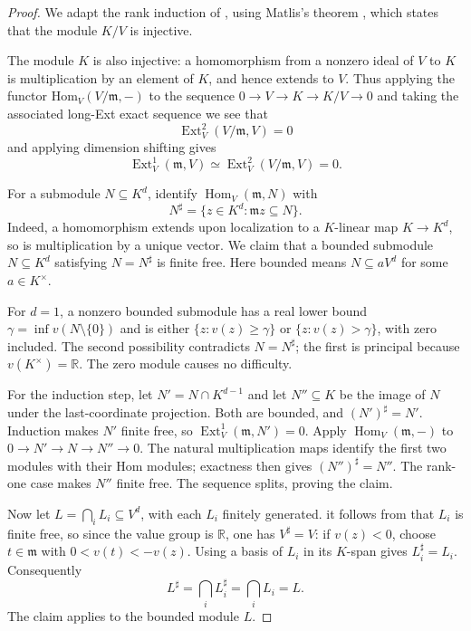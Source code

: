 \documentclass[12pt]{amsart}
\theoremstyle{plain}
\begin{document}
\begin{proof}
We adapt the rank induction of
\cite[Lemma~6.14]{BhattScholzeWittGrassmannian}, using Matlis's theorem
\cite[Theorem~4]{MatlisPruefer}, which states that the module $K/V$ is injective.

The module $K$ is also injective: a homomorphism from a nonzero ideal
of $V$ to $K$ is multiplication by an element of $K$, and hence
extends to $V$. Thus applying the functor Hom$_V(V/\mathfrak{m},-)$ to the sequence $0\to V\to K\to K/V\to0$ and taking the associated long-Ext exact sequence we see that $$\operatorname{Ext}^2_V(V/\mathfrak m,V)=0$$  and applying dimension
shifting gives
\[
\operatorname{Ext}^1_V(\mathfrak m,V)
\simeq \operatorname{Ext}^2_V(V/\mathfrak m,V)=0.
\]

\noindent For a submodule $N\subseteq K^d$, identify
$\operatorname{Hom}_V(\mathfrak m,N)$ with
\[
N^\sharp=\{z\in K^d:\mathfrak m z\subseteq N\}.
\]
Indeed, a homomorphism extends upon localization to a $K$-linear map
$K\to K^d$, so is multiplication by a unique vector.
We claim that a bounded submodule $N\subseteq K^d$ satisfying
$N=N^\sharp$ is finite free. Here bounded means $N\subseteq aV^d$
for some $a\in K^\times$.

For $d=1$, a nonzero bounded submodule has a real lower bound
$\gamma=\inf v(N\setminus\{0\})$ and is either
$\{z:v(z)\ge\gamma\}$ or $\{z:v(z)>\gamma\}$, with zero included.
The second possibility contradicts $N=N^\sharp$; the first is
principal because $v(K^\times)=\mathbb R$. The zero module causes
no difficulty.

For the induction step, let $N'=N\cap K^{d-1}$ and let $N''\subseteq K$
be the image of $N$ under the last-coordinate projection. Both are
bounded, and $(N')^\sharp=N'$. Induction makes $N'$ finite free, so
$\operatorname{Ext}^1_V(\mathfrak m,N')=0$. Apply
$\operatorname{Hom}_V(\mathfrak m,-)$ to
$0\to N'\to N\to N''\to0$.
The natural multiplication maps identify the first two modules with
their Hom modules; exactness then gives $(N'')^\sharp=N''$.
The rank-one case makes $N''$ finite free. The sequence splits, proving
the claim.

Now let $L=\bigcap_i L_i\subseteq V^d$, with each $L_i$ finitely generated. it follows from \cite[Lemma 3.1.1]{AntieauDatta} that $L_i$ is finite free, so since the value group is $\mathbb R$, one has $V^\sharp=V$:
if $v(z)<0$, choose $t\in\mathfrak m$ with $0<v(t)<-v(z)$.
Using a basis of $L_i$ in its $K$-span gives $L_i^\sharp=L_i$.
Consequently
\[
L^\sharp=\bigcap_i L_i^\sharp=\bigcap_i L_i=L.
\]
The claim applies to the bounded module $L$.
\end{proof}
\end{document}
